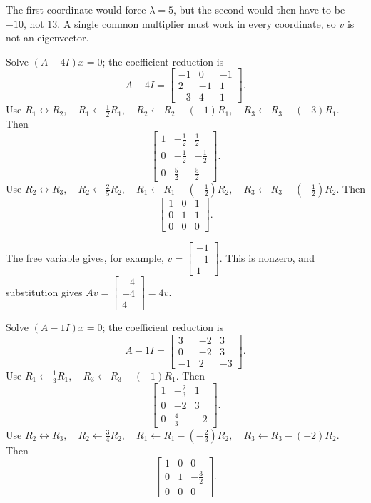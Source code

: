 The first coordinate would force $\lambda=5$, but the second would then have to be $-10$, not $13$. A single common multiplier must work in every coordinate, so $v$ is not an eigenvector.

Solve $(A-4I)x=0$; the coefficient reduction is
\[ A-4I=\begin{bmatrix}-1 & 0 & -1\\2 & -1 & 1\\-3 & 4 & 1\end{bmatrix}.\]
Use $R_{1}\leftrightarrow R_{2},\quad R_{1}\leftarrow \frac{1}{2}R_{1},\quad R_{2}\leftarrow R_{2}-(-1)R_{1},\quad R_{3}\leftarrow R_{3}-(-3)R_{1}$. Then
\[ \begin{bmatrix}1 & - \frac{1}{2} & \frac{1}{2}\\0 & - \frac{1}{2} & - \frac{1}{2}\\0 & \frac{5}{2} & \frac{5}{2}\end{bmatrix}.\]
Use $R_{2}\leftrightarrow R_{3},\quad R_{2}\leftarrow \frac{2}{5}R_{2},\quad R_{1}\leftarrow R_{1}-(- \frac{1}{2})R_{2},\quad R_{3}\leftarrow R_{3}-(- \frac{1}{2})R_{2}$. Then
\[ \begin{bmatrix}1 & 0 & 1\\0 & 1 & 1\\0 & 0 & 0\end{bmatrix}.\]

The free variable gives, for example, $v=\begin{bmatrix}-1\\-1\\1\end{bmatrix}$. This is nonzero, and substitution gives $Av=\begin{bmatrix}-4\\-4\\4\end{bmatrix}=4v$.

Solve $(A-1I)x=0$; the coefficient reduction is
\[ A-1I=\begin{bmatrix}3 & -2 & 3\\0 & -2 & 3\\-1 & 2 & -3\end{bmatrix}.\]
Use $R_{1}\leftarrow \frac{1}{3}R_{1},\quad R_{3}\leftarrow R_{3}-(-1)R_{1}$. Then
\[ \begin{bmatrix}1 & - \frac{2}{3} & 1\\0 & -2 & 3\\0 & \frac{4}{3} & -2\end{bmatrix}.\]
Use $R_{2}\leftrightarrow R_{3},\quad R_{2}\leftarrow \frac{3}{4}R_{2},\quad R_{1}\leftarrow R_{1}-(- \frac{2}{3})R_{2},\quad R_{3}\leftarrow R_{3}-(-2)R_{2}$. Then
\[ \begin{bmatrix}1 & 0 & 0\\0 & 1 & - \frac{3}{2}\\0 & 0 & 0\end{bmatrix}.\]

